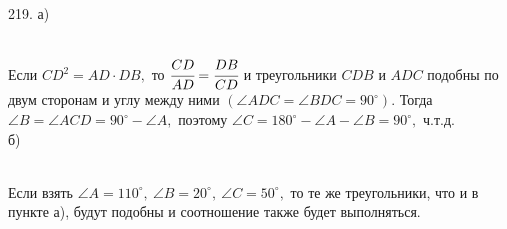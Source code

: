 219. а)\begin{figure}[ht!]
\end{figure}\\
Если $CD^2=AD\cdot DB,$ то $\cfrac{CD}{AD}=\cfrac{DB}{CD}$ и треугольники $CDB$ и $ADC$ подобны по двум сторонам и углу между ними $(\angle ADC=\angle BDC=90^\circ).$ Тогда $\angle B=\angle ACD=90^\circ-\angle A,$ поэтому $\angle C=180^\circ-\angle A-\angle B=90^\circ,$ ч.т.д.\\
б) \begin{figure}[ht!]
\end{figure}\\
Если взять $\angle A=110^\circ,\ \angle B=20^\circ,\ \angle C=50^\circ,$ то те же треугольники, что и в пункте а), будут подобны и соотношение также будет выполняться.\\
